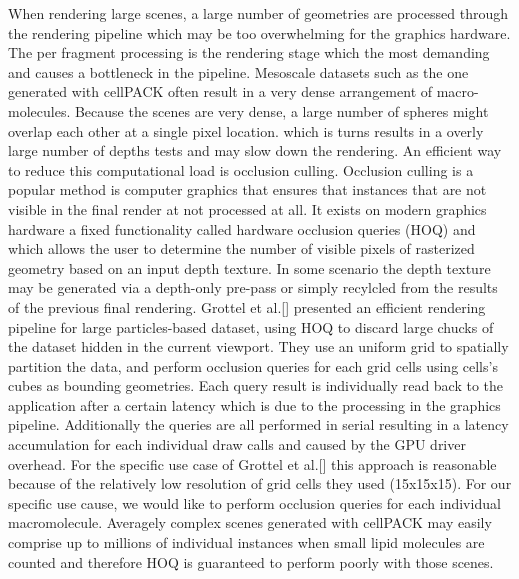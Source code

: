 When rendering large scenes, a large number of geometries are processed through the rendering pipeline which may be too overwhelming for the graphics hardware.
The per fragment processing is the rendering stage which the most demanding and causes a bottleneck in the pipeline.
Mesoscale datasets such as the one generated with cellPACK often result in a very dense arrangement of macro-molecules.
Because the scenes are very dense, a large number of spheres might overlap each other at a single pixel location.
which is turns results in a overly large number of depths tests and may slow down the rendering.
An efficient way to reduce this computational load is occlusion culling.
Occlusion culling is a popular method is computer graphics that ensures that instances that are not visible in the final render at not processed at all.
It exists on modern graphics hardware a fixed functionality called hardware occlusion queries (HOQ) and which allows the user to determine the number of visible pixels of rasterized geometry based on an input depth texture.
In some scenario the depth texture may be generated via a depth-only pre-pass or simply recylcled from the results of the previous final rendering.
Grottel et al.[] presented an efficient rendering pipeline for large particles-based dataset, using HOQ to discard large chucks of the dataset hidden in the current viewport.
They use an uniform grid to spatially partition the data, and perform occlusion queries for each grid cells using cells's cubes as bounding geometries.
Each query result is individually read back to the application after a certain latency which is due to the processing in the graphics pipeline.
Additionally the queries are all performed in serial resulting in a latency accumulation for each individual draw calls and caused by the GPU driver overhead.
For the specific use case of Grottel et al.[] this approach is reasonable because of the relatively low resolution of grid cells they used (15x15x15).
For our specific use cause, we would like to perform occlusion queries for each individual macromolecule.
Averagely complex scenes generated with cellPACK may easily comprise up to millions of individual instances when small lipid molecules are counted and therefore HOQ is guaranteed to perform poorly with those scenes.

